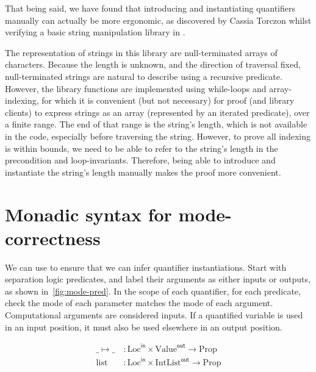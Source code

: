 That being said, we have found that introducing and instantiating quantifiers
manually can actually be more ergonomic, as discovered by Cassia Torczon whilst
verifying a basic string manipulation library in .%

The representation of strings in this library are null-terminated arrays of
characters. Because the length is unknown, and the direction of traversal
fixed, null-terminated strings are natural to describe using a recursive
predicate. However, the library functions are implemented using while-loops and
array-indexing, for which it is convenient (but not necessary) for proof (and
library clients) to express strings as an array (represented by an iterated
predicate), over a finite range. The end of that range is the string's length,
which is not available in the code, especially before traversing the string.
However, to prove all indexing is within bounds, we need to be able to refer to
the string's length in the precondition and loop-invariants. Therefore, being
able to introduce and instantiate the string's length manually makes the proof
more convenient.

\section{Monadic syntax for mode-correctness}\label{sec:monadic-syntax}

We can use  to ensure that we can infer quantifier instantiations.
Start with separation logic predicates, and label their arguments as either
inputs or outputs, as shown in~\cref{fig:mode-pred}. In
the scope of each quantifier, for each predicate, check the mode of each
parameter matches the mode of each argument. Computational arguments are
considered inputs. If a quantified variable is used in an input position, it
must also be used elsewhere in an output position.

\begin{marginfigure}
    \centering
    \small%
    \begin{align*}
        \_ \mapsto \_ \:&: \mathrm{Loc}^{\mathsf{in}} \times \mathrm{Value}^{\mathsf{out}} \rightarrow \mathrm{Prop} \\
        \mathrm{list} \:&: \mathrm{Loc}^{\mathsf{in}} \times \mathrm{IntList}^{\mathsf{out}} \rightarrow \mathrm{Prop}
    \end{align*}
    \caption{Modes on separation logic predicates.}\label{fig:mode-pred}
\end{marginfigure}

